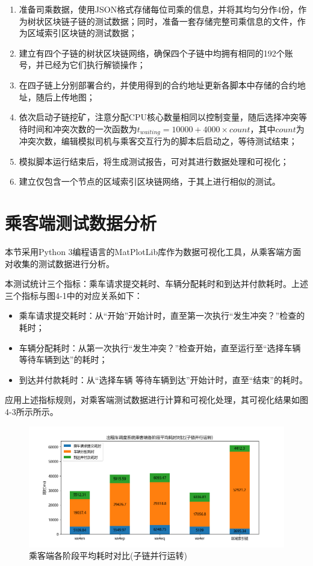 \begin{enumerate}
    \item 准备司乘数据，使用JSON格式存储每位司乘的信息，并将其均匀分作4份，作为树状区块链子链的测试数据；同时，准备一套存储完整司乘信息的文件，作为区域索引区块链的测试数据；
    \item 建立有四个子链的树状区块链网络，确保四个子链中均拥有相同的192个账号，并已经为它们执行解锁操作；
    \item 在四子链上分别部署合约，并使用得到的合约地址更新各脚本中存储的合约地址，随后上传地图；
    \item 依次启动子链挖矿，注意分配CPU核心数量相同以控制变量，随后选择冲突等待时间和冲突次数的一次函数为$t_{waiting} = 10000 + 4000 \times count$，其中$count$为冲突次数，编辑模拟司机与乘客交互行为的脚本后启动之，等待测试结束；
    \item 模拟脚本运行结束后，将生成测试报告，可对其进行数据处理和可视化；
    \item 建立仅包含一个节点的区域索引区块链网络，于其上进行相似的测试。
\end{enumerate}

\section{乘客端测试数据分析}

本节采用Python 3编程语言的MatPlotLib库作为数据可视化工具，从乘客端方面对收集的测试数据进行分析。

本测试统计三个指标：乘车请求提交耗时、车辆分配耗时和到达并付款耗时。上述三个指标与图4-1中的对应关系如下：

\begin{itemize}
    \item 乘车请求提交耗时：从“开始”开始计时，直至第一次执行“发生冲突？”检查的耗时；
    \item 车辆分配耗时：从第一次执行“发生冲突？”检查开始，直至运行至“选择车辆 等待车辆到达”的耗时；
    \item 到达并付款耗时：从“选择车辆 等待车辆到达”开始计时，直至“结束”的耗时。
\end{itemize}

应用上述指标规则，对乘客端测试数据进行计算和可视化处理，其可视化结果如图4-3所示所示。

\begin{figure}[htbp]
    \centering
    \includegraphics[width=\textwidth]{images/乘客端测试-并行.png}
    \caption{乘客端各阶段平均耗时对比(子链并行运转)}\label{乘客端耗时对比(子链并行运行)} %
\end{figure}

